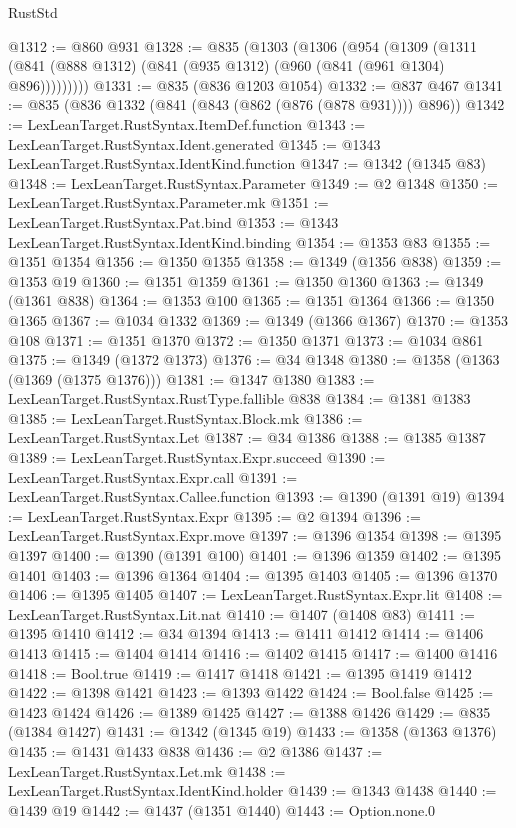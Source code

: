 \begin{lexlean}{RustStd}
\begin{coremodule}
@1312 := @860 @931
@1328 := @835
    (@1303
      (@1306
        (@954
          (@1309 (@1311 (@841 (@888 @1312) (@841 (@935 @1312) (@960 (@841 (@961 @1304) @896)))))))))
@1331 := @835 (@836 @1203 @1054)
@1332 := @837 @467
@1341 := @835 (@836 @1332 (@841 (@843 (@862 (@876 (@878 @931)))) @896))
@1342 := LexLeanTarget.RustSyntax.ItemDef.function
@1343 := LexLeanTarget.RustSyntax.Ident.generated
@1345 := @1343 LexLeanTarget.RustSyntax.IdentKind.function
@1347 := @1342 (@1345 @83)
@1348 := LexLeanTarget.RustSyntax.Parameter
@1349 := @2 @1348
@1350 := LexLeanTarget.RustSyntax.Parameter.mk
@1351 := LexLeanTarget.RustSyntax.Pat.bind
@1353 := @1343 LexLeanTarget.RustSyntax.IdentKind.binding
@1354 := @1353 @83
@1355 := @1351 @1354
@1356 := @1350 @1355
@1358 := @1349 (@1356 @838)
@1359 := @1353 @19
@1360 := @1351 @1359
@1361 := @1350 @1360
@1363 := @1349 (@1361 @838)
@1364 := @1353 @100
@1365 := @1351 @1364
@1366 := @1350 @1365
@1367 := @1034 @1332
@1369 := @1349 (@1366 @1367)
@1370 := @1353 @108
@1371 := @1351 @1370
@1372 := @1350 @1371
@1373 := @1034 @861
@1375 := @1349 (@1372 @1373)
@1376 := @34 @1348
@1380 := @1358 (@1363 (@1369 (@1375 @1376)))
@1381 := @1347 @1380
@1383 := LexLeanTarget.RustSyntax.RustType.fallible @838
@1384 := @1381 @1383
@1385 := LexLeanTarget.RustSyntax.Block.mk
@1386 := LexLeanTarget.RustSyntax.Let
@1387 := @34 @1386
@1388 := @1385 @1387
@1389 := LexLeanTarget.RustSyntax.Expr.succeed
@1390 := LexLeanTarget.RustSyntax.Expr.call
@1391 := LexLeanTarget.RustSyntax.Callee.function
@1393 := @1390 (@1391 @19)
@1394 := LexLeanTarget.RustSyntax.Expr
@1395 := @2 @1394
@1396 := LexLeanTarget.RustSyntax.Expr.move
@1397 := @1396 @1354
@1398 := @1395 @1397
@1400 := @1390 (@1391 @100)
@1401 := @1396 @1359
@1402 := @1395 @1401
@1403 := @1396 @1364
@1404 := @1395 @1403
@1405 := @1396 @1370
@1406 := @1395 @1405
@1407 := LexLeanTarget.RustSyntax.Expr.lit
@1408 := LexLeanTarget.RustSyntax.Lit.nat
@1410 := @1407 (@1408 @83)
@1411 := @1395 @1410
@1412 := @34 @1394
@1413 := @1411 @1412
@1414 := @1406 @1413
@1415 := @1404 @1414
@1416 := @1402 @1415
@1417 := @1400 @1416
@1418 := Bool.true
@1419 := @1417 @1418
@1421 := @1395 @1419 @1412
@1422 := @1398 @1421
@1423 := @1393 @1422
@1424 := Bool.false
@1425 := @1423 @1424
@1426 := @1389 @1425
@1427 := @1388 @1426
@1429 := @835 (@1384 @1427)
@1431 := @1342 (@1345 @19)
@1433 := @1358 (@1363 @1376)
@1435 := @1431 @1433 @838
@1436 := @2 @1386
@1437 := LexLeanTarget.RustSyntax.Let.mk
@1438 := LexLeanTarget.RustSyntax.IdentKind.holder
@1439 := @1343 @1438
@1440 := @1439 @19
@1442 := @1437 (@1351 @1440)
@1443 := Option.none.{0}

\end{coremodule}
\end{lexlean}
